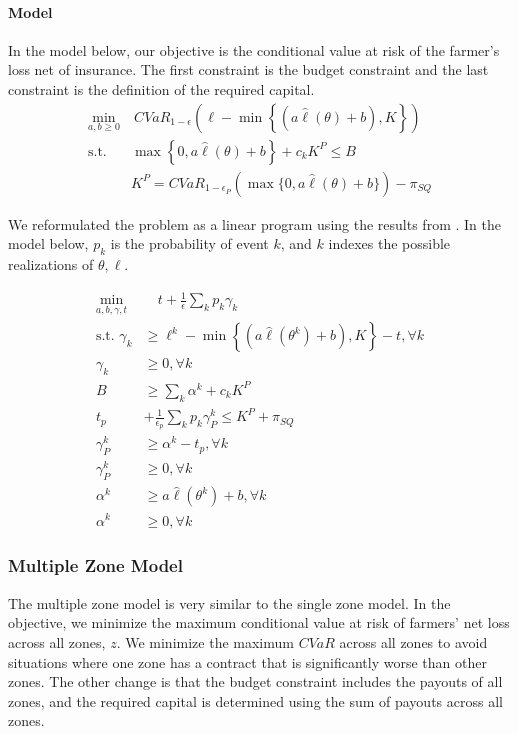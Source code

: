 \documentclass[11pt]{article}
\begin{document}
  \paragraph*{Model}
  In the model below, our objective is the conditional value at risk of the farmer's loss net of insurance. The first constraint is the budget constraint and the last constraint is the definition of the required capital. 
  \begin{align}
    \min_{a,b\geq 0} &\ CVaR_{1-\epsilon}\left(\ell  - \min \left \{(a \hat{\ell}(\theta) + b), K \right \} \right)\\
    \text{s.t.   } & \max \left \{0,a \hat{\ell}(\theta) +b \right \} +c_k K^P \leq B\\
    & K^P = CVaR_{1-\epsilon_P} \left( \max \{0,a \hat{\ell}(\theta) +b \} \right) - \pi_{SQ}
\end{align}

  We reformulated the problem as a linear program  using the results from \cite{rockafellar2000optimization}. In the model below, $p_k$ is the probability of event $k$, and $k$ indexes the possible realizations of $\theta, \ell$.
  
  \begin{align}
      \min_{a,b,\gamma,t} &\quad t + \frac{1}{\epsilon}\sum_k p_k \gamma_k\\
      \text{s.t.   } \gamma_k &\geq \ell^k - \min\left\{(a\hat{\ell}(\theta^k) + b), K\right\} - t, \forall k\\
      \gamma_k &\geq 0, \forall k \\
        B &\geq \sum_k \alpha^k + c_k K^P\\
        t_p &+ \frac{1}{\epsilon_p} \sum_k p_k \gamma_P^k \leq K^P+\pi_{SQ}\\
        \gamma_P^k &\geq \alpha^k -t_p, \forall k \\
        \gamma_P^k &\geq 0, \forall k\\
        \alpha^k &\geq a \hat{\ell}(\theta^k) + b, \forall k\\
        \alpha^k &\geq 0, \forall k
  \end{align}
    
  \subsubsection{Multiple Zone Model}
  The multiple zone model is very similar to the single zone model. In the objective, we minimize the maximum conditional value at risk of  farmers' net loss across all zones, $z$. We minimize the maximum $CVaR$ across all zones to avoid situations where one zone has a contract that is significantly worse than other zones. The other change is that the budget constraint includes the payouts of all zones, and the required capital is determined using the sum of payouts across all zones. 
\end{document}
